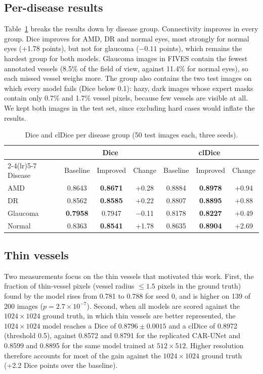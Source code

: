 \documentclass[a4paper,fleqn]{cas-sc}
\begin{document}
\subsection{Per-disease results}

Table~\ref{tab:disease} breaks the results down by disease group. Connectivity improves in every group. Dice improves for AMD, DR and normal eyes, most strongly for normal eyes (+1.78 points), but not for glaucoma ($-0.11$ points), which remains the hardest group for both models. Glaucoma images in FIVES contain the fewest annotated vessels (8.5\% of the field of view, against 11.4\% for normal eyes), so each missed vessel weighs more. The group also contains the two test images on which every model fails (Dice below 0.1): hazy, dark images whose expert masks contain only 0.7\% and 1.7\% vessel pixels, because few vessels are visible at all. We kept both images in the test set, since excluding hard cases would inflate the results.

\begin{table}[t]
\caption{Dice and clDice per disease group (50 test images each, three seeds).}
\label{tab:disease}
\centering
\begin{tabular}{lcccccc}
\toprule
 & \multicolumn{3}{c}{Dice} & \multicolumn{3}{c}{clDice} \\
\cmidrule(lr){2-4}\cmidrule(lr){5-7}
Disease & Baseline & Improved & Change & Baseline & Improved & Change \\
\midrule
AMD & 0.8643 & \textbf{0.8671} & +0.28 & 0.8884 & \textbf{0.8978} & +0.94 \\
DR & 0.8562 & \textbf{0.8585} & +0.22 & 0.8807 & \textbf{0.8895} & +0.88 \\
Glaucoma & \textbf{0.7958} & 0.7947 & $-$0.11 & 0.8178 & \textbf{0.8227} & +0.49 \\
Normal & 0.8363 & \textbf{0.8541} & +1.78 & 0.8635 & \textbf{0.8904} & +2.69 \\
\bottomrule
\end{tabular}
\end{table}

\subsection{Thin vessels}

Two measurements focus on the thin vessels that motivated this work. First, the fraction of thin-vessel pixels (vessel radius $\le 1.5$ pixels in the ground truth) found by the model rises from 0.781 to 0.788 for seed 0, and is higher on 139 of 200 images ($p = 2.7\times10^{-7}$). Second, when all models are scored against the $1024\times1024$ ground truth, in which thin vessels are better represented, the $1024\times1024$ model reaches a Dice of $0.8796 \pm 0.0015$ and a clDice of 0.8972 (threshold 0.5), against 0.8572 and 0.8791 for the replicated CAR-UNet and 0.8599 and 0.8895 for the same model trained at $512\times512$. Higher resolution therefore accounts for most of the gain against the $1024\times1024$ ground truth (+2.2 Dice points over the baseline).
\end{document}
